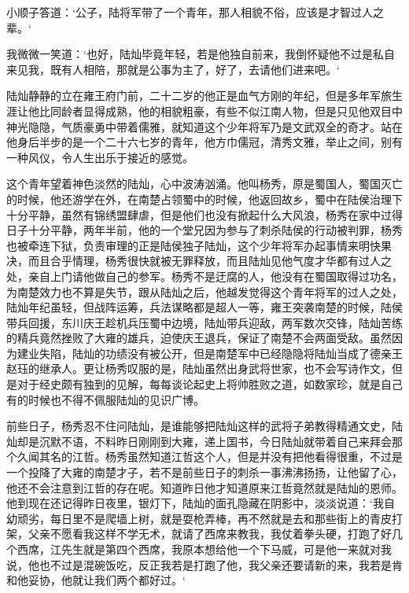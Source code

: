 小顺子答道：‘公子，陆将军带了一个青年，那人相貌不俗，应该是才智过人之辈。‘

我微微一笑道：‘也好，陆灿毕竟年轻，若是他独自前来，我倒怀疑他不过是私自来见我，既有人相陪，那就是公事为主了，好了，去请他们进来吧。‘

陆灿静静的立在雍王府门前，二十二岁的他正是血气方刚的年纪，但是多年军旅生涯让他比同龄者显得成熟，他的相貌粗豪，有些不似江南人物，但是只见他双目中神光隐隐，气质豪勇中带着儒雅，就知道这个少年将军乃是文武双全的奇才。站在他身后半步的是一个二十六七岁的青年，他方巾儒冠，清秀文雅，举止之间，别有一种风仪，令人生出乐于接近的感觉。

这个青年望着神色淡然的陆灿，心中波涛汹涌。他叫杨秀，原是蜀国人，蜀国灭亡的时候，他还游学在外，在南楚占领蜀中的时候，他返回故乡，蜀中在陆侯治理下十分平静，虽然有锦绣盟肆虐，但是他们也没有掀起什么大风浪，杨秀在家中过得日子十分平静，两年半前，他的一个堂兄因为参与了刺杀陆侯的行动被判罪，杨秀也被牵连下狱，负责审理的正是陆侯独子陆灿，这个少年将军办起事情来明快果决，而且合乎情理，杨秀很快就被无罪释放，而且陆灿见他气度才华都有过人之处，亲自上门请他做自己的参军。杨秀不是迂腐的人，他没有在蜀国取得过功名，为南楚效力也不算是失节，跟从陆灿之后，他越发觉得这个青年将军的过人之处，陆灿年纪虽轻，但战阵运筹，兵法谋略都是超人一等，雍王突袭南楚的时候，陆侯带兵回援，东川庆王趁机兵压蜀中边境，陆灿带兵迎敌，两军数次交锋，陆灿苦练的精兵竟然挫败了大雍的雄兵，迫使庆王退兵，保证了南楚不会两面受敌。虽然因为建业失陷，陆灿的功绩没有被公开，但是南楚军中已经隐隐将陆灿当成了德亲王赵珏的继承人。更让杨秀叹服的是，陆灿虽然出身武将世家，也不会写诗作文，但是对于经史颇有独到的见解，每每谈论起史上将帅胜败之道，如数家珍，就是自己有的时候也不得不佩服陆灿的见识广博。

前些日子，杨秀忍不住问陆灿，是谁能够把陆灿这样的武将子弟教得精通文史，陆灿却是沉默不语，不料昨日刚刚到大雍，递上国书，今日陆灿就带着自己来拜会那个久闻其名的江哲。杨秀虽然知道江哲这个人，但是并没有把他看得很重，不过是一个投降了大雍的南楚才子，若不是前些日子的刺杀一事沸沸扬扬，让他留了心，他还不会注意到江哲的存在呢。知道昨日他才知道原来江哲竟然就是陆灿的恩师。他到现在还记得昨日夜里，银灯下，陆灿的面孔隐藏在阴影中，淡淡说道：‘我自幼顽劣，每日里不是爬墙上树，就是耍枪弄棒，再不然就是去和那些街上的青皮打架，父亲不愿看我这样不学无术，就请了西席来教我，我仗着拳头硬，打跑了好几个西席，江先生就是第四个西席，我原本想给他一个下马威，可是他一来就对我说，他也不过是混碗饭吃，反正我若是打跑了他，我父亲还要请新的来，我若是肯和他妥协，他就让我们两个都好过。‘

